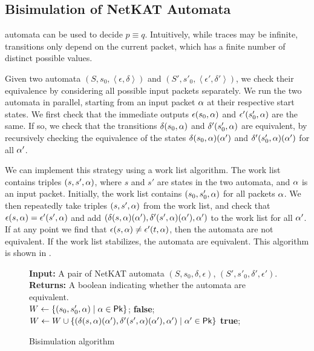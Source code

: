 \documentclass[acmsmall,dvipsnames,nonacm]{acmart}
\begin{document}
\subsection{Bisimulation of NetKAT Automata}\label{sec:bisimulation}

\NetKAT automata can be used to decide $p \equiv q$.  Intuitively,
while traces may be infinite, transitions only depend on the current
packet, which has a finite number of distinct possible values.

Given two automata $(S, s_0, \left<\epsilon, \delta\right>)$ and $(S', s'_0, \left<\epsilon', \delta'\right>)$, we check their equivalence by considering all possible input packets separately.
We run the two automata in parallel, starting from an input packet $\alpha$ at their respective start states. We first check that the immediate outputs $\epsilon(s_0, \alpha)$ and $\epsilon'(s'_0, \alpha)$ are the same.
If so, we check that the transitions $\delta(s_0, \alpha)$ and $\delta'(s'_0, \alpha)$ are equivalent, by recursively checking the equivalence of the states $\delta(s_0, \alpha)(\alpha')$ and $\delta'(s'_0, \alpha)(\alpha')$ for all $\alpha'$.

We can implement this strategy using a work list algorithm. The work list contains triples $(s, s', \alpha)$, where $s$ and $s'$ are states in the two automata, and $\alpha$ is an input packet. Initially, the work list contains $(s_0, s'_0, \alpha)$ for all packets $\alpha$. We then repeatedly take triples $(s, s', \alpha)$ from the work list, and check that $\epsilon(s, \alpha) = \epsilon'(s', \alpha)$ and add $(\delta(s, \alpha)(\alpha'), \delta'(s', \alpha)(\alpha'), \alpha')$ to the work list for all $\alpha'$. If at any point we find that $\epsilon(s, \alpha) \neq \epsilon'(t, \alpha)$, then the automata are not equivalent.
If the work list stabilizes, the automata are equivalent. This algorithm is shown in .

\begin{figure}
    \begin{algorithmic}
    \State \textbf{Input:} A pair of NetKAT automata $(S, s_0, \delta, \epsilon)$, $(S', s'_0, \delta', \epsilon').$
    \State \textbf{Returns:} A boolean indicating whether the automata are equivalent.\\
    \State $W \gets \{ (s_0, s'_0, \alpha) \mid \alpha \in \mathsf{Pk} \}$;
                \Return \textbf{false};
            \EndIf
            \State $W \gets W \cup \{ (\delta(s, \alpha)(\alpha'), \delta'(s', \alpha)(\alpha'), \alpha') \mid \alpha' \in \mathsf{Pk} \}$
        \EndFor
    \EndWhile
    \State
    \Return \textbf{true};
    \end{algorithmic}
    \caption{Bisimulation algorithm}
    \label{fig:bisim}
\end{figure}
\end{document}

